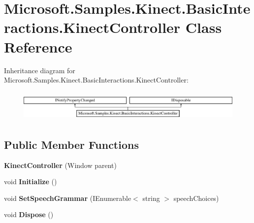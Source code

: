 \hypertarget{class_microsoft_1_1_samples_1_1_kinect_1_1_basic_interactions_1_1_kinect_controller}{\section{Microsoft.\-Samples.\-Kinect.\-Basic\-Interactions.\-Kinect\-Controller Class Reference}
\label{class_microsoft_1_1_samples_1_1_kinect_1_1_basic_interactions_1_1_kinect_controller}
}
Inheritance diagram for Microsoft.\-Samples.\-Kinect.\-Basic\-Interactions.\-Kinect\-Controller\-:\begin{figure}[H]
\begin{center}
\leavevmode
\includegraphics[height=1.564246cm]{class_microsoft_1_1_samples_1_1_kinect_1_1_basic_interactions_1_1_kinect_controller}
\end{center}
\end{figure}
\subsection*{Public Member Functions}
\begin{DoxyCompactItemize}
\item 
\hypertarget{class_microsoft_1_1_samples_1_1_kinect_1_1_basic_interactions_1_1_kinect_controller_a0452c27825eb040875b1cb6fe85863a8}{{\bfseries Kinect\-Controller} (Window parent)}\label{class_microsoft_1_1_samples_1_1_kinect_1_1_basic_interactions_1_1_kinect_controller_a0452c27825eb040875b1cb6fe85863a8}

\item 
\hypertarget{class_microsoft_1_1_samples_1_1_kinect_1_1_basic_interactions_1_1_kinect_controller_a9826455f8637c92b8dd86fefdc325578}{void {\bfseries Initialize} ()}\label{class_microsoft_1_1_samples_1_1_kinect_1_1_basic_interactions_1_1_kinect_controller_a9826455f8637c92b8dd86fefdc325578}

\item 
\hypertarget{class_microsoft_1_1_samples_1_1_kinect_1_1_basic_interactions_1_1_kinect_controller_a87ee7a0b62922f566f0f4e845401cb0e}{void {\bfseries Set\-Speech\-Grammar} (I\-Enumerable$<$ string $>$ speech\-Choices)}\label{class_microsoft_1_1_samples_1_1_kinect_1_1_basic_interactions_1_1_kinect_controller_a87ee7a0b62922f566f0f4e845401cb0e}

\item 
\hypertarget{class_microsoft_1_1_samples_1_1_kinect_1_1_basic_interactions_1_1_kinect_controller_a6b25b24877d67dcef70323ecc2006997}{void {\bfseries Dispose} ()}\label{class_microsoft_1_1_samples_1_1_kinect_1_1_basic_interactions_1_1_kinect_controller_a6b25b24877d67dcef70323ecc2006997}

\end{DoxyCompactItemize}
